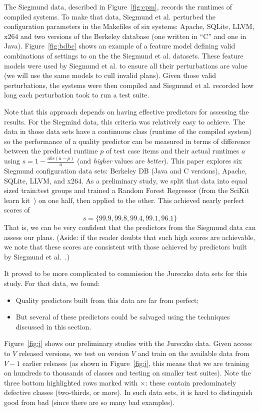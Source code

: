 \documentclass{sig-alternate}
\newcommand{\bi}{\begin{itemize}}
\newcommand{\ei}{\end{itemize}}
\newcommand{\fig}[1]{Figure~\ref{fig:#1}}
\begin{document}
  The Siegmund data, described in \fig{cpm},  records  the runtimes of compiled systems. To make that data, Siegmund et al. perturbed
  the configuration parameters in the Makefiles of six systems: Apache, SQLite, LLVM, x264 and two versions of the
  Berkeley database (one written in ``C'' and one in Java). 
   \fig{bdbc} shows an example of a feature model defining valid combinations of settings to on the
   the Siegmund et al. datasets. These feature models were used by Siegmund et al. to ensure all their perturbations are value
   (we will use the same models to cull invalid plans).
  Given those valid perturbations, the systems were then compiled and 
  Siegmund et al. recorded how long each perturbation took to run a test suite. 
  
  
  
  Note that this approach depends on having effective predictors for assessing the results.
  For the Siegmind data, this criteria was   relatively easy to achieve.
  The data in those data sets have a continuous class (runtime of the compiled system)
  so the performance of a quality predictor can  be measured in terms of  difference between the predicted runtime $p$ of test case items and their actual runtimes $a$ using  $s= 1 - \frac{abs(a - p)}{a}$ (and {\em higher} values are {\em better}).
This paper  explores six Siegmund configuration data sets:  Berkeley DB (Java and C versions), Apache, SQLite, LLVM, and
  x264. 
  As a preliminary study, we split that data   into equal sized train:test groups
  and trained a Random Forest
  Regressor (from the SciKit learn kit~\cite{Pedregosa2012})   on one half, then applied to the other. This  achieved nearly perfect scores of \[s=\{99.9, 99.8, 99.4, 99.1, 96.1\}\] 
That is, we can be very confident that the predictors from the Siegmund data can assess
our plans. (Aside: if the reader doubts that such high scores are achievable, we note that these scores are consistent with those achieved by predictors built by Siegmund et al.~\cite{sven12}.)



 It proved to be  more complicated to commission the Jureczko data sets for this study.
 For that data, we found:
\bi
\item
 Quality predictors built from this data are far from perfect;
\item 
But several of these predictors could
be salvaged using the techniques discussed in this section.
\ei
 \fig{j} shows our preliminary studies with the Jureczko   data.
Given access to $V$ released
versions, we test on version $V$ and train on the available data from $V-1$ earlier releases (as
shown in \fig{j}, this means that we are training on hundreds to thousands
of classes and testing on smaller test suites).
Note the three bottom \colorbox{lavenderpink}{highlighted} rows marked with $\times$: these contain predominately
defective classes (two-thirds, or more).  In such data sets, it is hard to distinguish
good from bad (since there are so many bad examples). 
\end{document}
